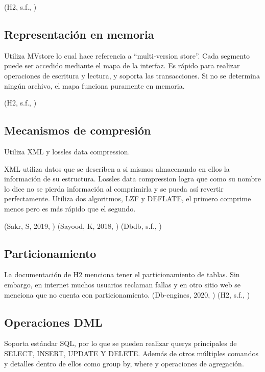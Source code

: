 \documentclass{acmart}
\begin{document}
(H2, s.f., \cite{h2performance})

\subsection{Representación en memoria}

Utiliza MVstore lo cual hace referencia a “multi-version store”. Cada segmento puede ser accedido mediante el mapa de la interfaz. Es rápido para realizar operaciones de escritura y lectura, y soporta las transacciones. Si no se determina ningún archivo, el mapa funciona puramente en memoria. 

(H2, s.f., \cite{h2mvstore})

\subsection{Mecanismos de compresión}

Utiliza XML y lossles data compression. 

XML utiliza datos que se describen a si mismos almacenando en ellos la información de su estructura. Lossles data compression logra que como su nombre lo dice no se pierda información al comprimirla y se pueda así revertir perfectamente.  Utiliza dos algoritmos, LZF y DEFLATE, el primero comprime menos pero es más rápido que el segundo.  

(Sakr, S, 2019, \cite{h2xml})
(Sayood, K, 2018, \cite{h2losslesscompression})
(Dbdb, s.f., \cite{h2database})



\subsection{Particionamiento}

La documentación de H2 menciona tener el particionamiento de tablas. Sin embargo, en internet muchos usuarios reclaman fallas y en otro sitio web se menciona que no cuenta con particionamiento. 
(Db-engines, 2020, \cite{h2vsoracle})
(H2, s.f., \cite{h2roadmap})



\subsection{Operaciones DML}

Soporta estándar SQL, por lo que se pueden realizar querys principales de SELECT, INSERT, UPDATE Y DELETE.  Además de otros múltiples comandos y detalles dentro de ellos como group by, where y operaciones de agregación. 
\end{document}
